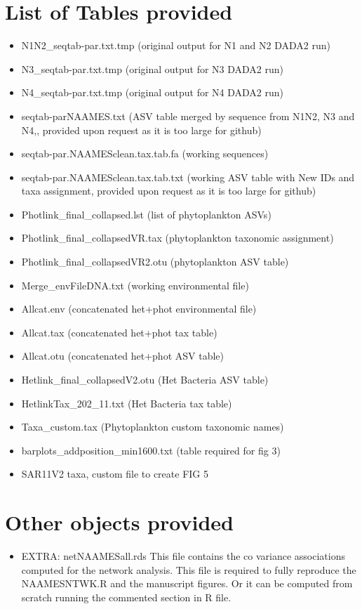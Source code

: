 \documentclass{article}
\begin{document}
\section{List of Tables provided}
\begin{itemize}
\item N1N2\_seqtab-par.txt.tmp (original output for N1 and N2 DADA2 run)
\item N3\_seqtab-par.txt.tmp (original output for N3 DADA2 run)
\item N4\_seqtab-par.txt.tmp (original output for N4 DADA2 run)
\item seqtab-parNAAMES.txt (ASV table merged by sequence from N1N2, N3 and N4,, provided upon request as it is too large for github)
\item seqtab-par.NAAMESclean.tax.tab.fa (working sequences)
\item seqtab-par.NAAMESclean.tax.tab.txt (working ASV table with New IDs and taxa assignment, provided upon request as it is too large for github)
\item Photlink\_final\_collapsed.lst (list of phytoplankton ASVs)
\item Photlink\_final\_collapsedVR.tax (phytoplankton taxonomic assignment)
\item Photlink\_final\_collapsedVR2.otu (phytoplankton ASV table)
\item Merge\_envFileDNA.txt (working environmental file)
\item Allcat.env (concatenated het+phot environmental file)
\item Allcat.tax (concatenated het+phot tax table)
\item Allcat.otu (concatenated het+phot ASV table)
\item Hetlink\_final\_collapsedV2.otu (Het Bacteria ASV table)
\item HetlinkTax\_202\_11.txt (Het Bacteria tax table)
\item Taxa\_custom.tax (Phytoplankton custom taxonomic names)
\item barplots\_addposition\_min1600.txt (table required for fig 3)
\item SAR11V2 taxa, custom file to create FIG 5
\end{itemize}

\section{Other objects provided}
\begin{itemize}
\item EXTRA: netNAAMESall.rds This file contains the co variance associations computed for the network analysis. This file is required to fully reproduce the NAAMESNTWK.R and the manuscript figures. Or it can be computed from scratch running the commented section in R file. 
\end{itemize}
\end{document}
